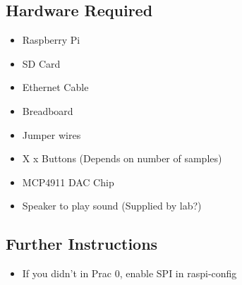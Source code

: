 \subsection{Hardware Required}
\begin{itemize}
    \item Raspberry Pi
    \item SD Card
    \item Ethernet Cable
    \item Breadboard
    \item Jumper wires
    \item X x Buttons (Depends on number of samples)
    \item MCP4911 DAC Chip
    \item Speaker to play sound (Supplied by lab?)
\end{itemize}


\subsection{Further Instructions}
\begin{itemize}
    \item If you didn't in Prac 0, enable SPI in raspi-config
\end{itemize}